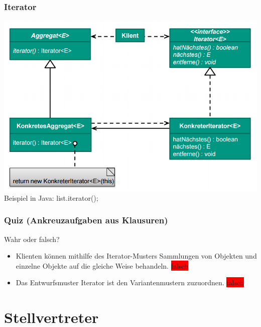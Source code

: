 \documentclass[18pt]{beamer}
\begin{document}
	\begin{frame}
		\frametitle{Iterator}
		\centering
		\includegraphics[scale=0.35]{./pics/tut3/iter.png}
		\linebreak Beispiel in Java: list.iterator();
	\end{frame}

	\begin{frame}
		\frametitle{Quiz (Ankreuzaufgaben aus Klausuren)}
		Wahr oder falsch?
		\begin{itemize}
			\item Klienten können mithilfe des Iterator-Musters Sammlungen von Objekten und einzelne Objekte auf die gleiche Weise behandeln. \pause \colorbox{red}{falsch} \pause
			\item Das Entwurfsmuster Iterator ist den Variantenmustern zuzuordnen. \pause \colorbox{red}{falsch} 
		\end{itemize}
	\end{frame}

\section{Stellvertreter}
\end{document}

